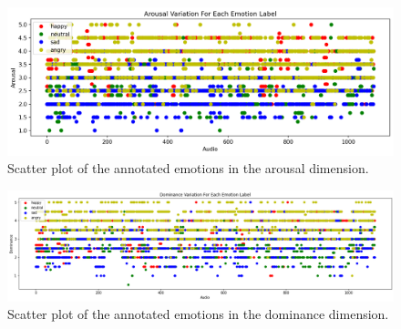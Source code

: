 \begin{figure}[H]
	\centering
	\includegraphics[width=\linewidth]{figs/appendix/IEMOCAP_data_study/activationScatterAllEmotions.png}
	\caption{Scatter plot of the annotated emotions in the arousal dimension.}
\end{figure}

\begin{figure}[H]
	\centering
	\includegraphics[width=\linewidth]{figs/appendix/IEMOCAP_data_study/dominanceScatterAllEmotions.png}
	\caption{Scatter plot of the annotated emotions in the dominance dimension.}
\end{figure}



